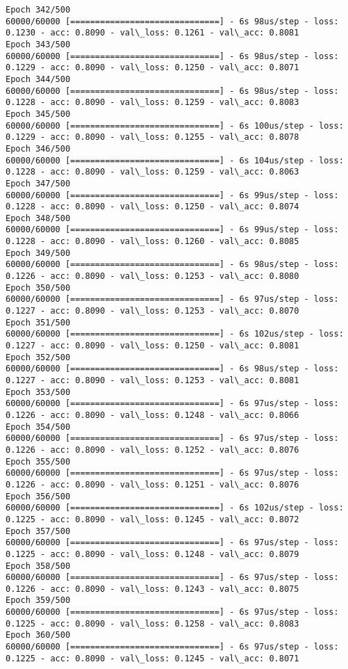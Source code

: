 \documentclass[11pt]{article}
\begin{document}
\begin{Verbatim}[commandchars=\\\{\}]
Epoch 342/500
60000/60000 [==============================] - 6s 98us/step - loss: 0.1230 - acc: 0.8090 - val\_loss: 0.1261 - val\_acc: 0.8081
Epoch 343/500
60000/60000 [==============================] - 6s 98us/step - loss: 0.1229 - acc: 0.8090 - val\_loss: 0.1250 - val\_acc: 0.8071
Epoch 344/500
60000/60000 [==============================] - 6s 98us/step - loss: 0.1228 - acc: 0.8090 - val\_loss: 0.1259 - val\_acc: 0.8083
Epoch 345/500
60000/60000 [==============================] - 6s 100us/step - loss: 0.1229 - acc: 0.8090 - val\_loss: 0.1255 - val\_acc: 0.8078
Epoch 346/500
60000/60000 [==============================] - 6s 104us/step - loss: 0.1228 - acc: 0.8090 - val\_loss: 0.1259 - val\_acc: 0.8063
Epoch 347/500
60000/60000 [==============================] - 6s 99us/step - loss: 0.1228 - acc: 0.8090 - val\_loss: 0.1250 - val\_acc: 0.8074
Epoch 348/500
60000/60000 [==============================] - 6s 99us/step - loss: 0.1228 - acc: 0.8090 - val\_loss: 0.1260 - val\_acc: 0.8085
Epoch 349/500
60000/60000 [==============================] - 6s 98us/step - loss: 0.1226 - acc: 0.8090 - val\_loss: 0.1253 - val\_acc: 0.8080
Epoch 350/500
60000/60000 [==============================] - 6s 97us/step - loss: 0.1227 - acc: 0.8090 - val\_loss: 0.1253 - val\_acc: 0.8070
Epoch 351/500
60000/60000 [==============================] - 6s 102us/step - loss: 0.1227 - acc: 0.8090 - val\_loss: 0.1250 - val\_acc: 0.8081
Epoch 352/500
60000/60000 [==============================] - 6s 98us/step - loss: 0.1227 - acc: 0.8090 - val\_loss: 0.1253 - val\_acc: 0.8081
Epoch 353/500
60000/60000 [==============================] - 6s 97us/step - loss: 0.1226 - acc: 0.8090 - val\_loss: 0.1248 - val\_acc: 0.8066
Epoch 354/500
60000/60000 [==============================] - 6s 97us/step - loss: 0.1226 - acc: 0.8090 - val\_loss: 0.1252 - val\_acc: 0.8076
Epoch 355/500
60000/60000 [==============================] - 6s 97us/step - loss: 0.1226 - acc: 0.8090 - val\_loss: 0.1251 - val\_acc: 0.8076
Epoch 356/500
60000/60000 [==============================] - 6s 102us/step - loss: 0.1225 - acc: 0.8090 - val\_loss: 0.1245 - val\_acc: 0.8072
Epoch 357/500
60000/60000 [==============================] - 6s 97us/step - loss: 0.1225 - acc: 0.8090 - val\_loss: 0.1248 - val\_acc: 0.8079
Epoch 358/500
60000/60000 [==============================] - 6s 97us/step - loss: 0.1226 - acc: 0.8090 - val\_loss: 0.1243 - val\_acc: 0.8075
Epoch 359/500
60000/60000 [==============================] - 6s 97us/step - loss: 0.1225 - acc: 0.8090 - val\_loss: 0.1258 - val\_acc: 0.8083
Epoch 360/500
60000/60000 [==============================] - 6s 97us/step - loss: 0.1225 - acc: 0.8090 - val\_loss: 0.1245 - val\_acc: 0.8071

\end{Verbatim}
\end{document}
